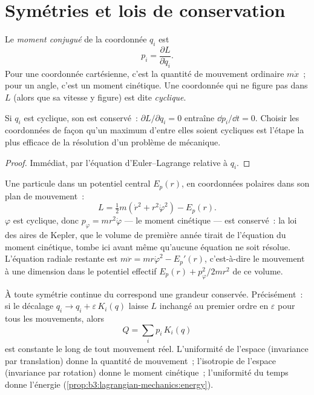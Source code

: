 \section{Symétries et lois de conservation}

\begin{definition}\label{def:b3:lagrangian-mechanics:momentum}
Le \emph{moment conjugué} de la coordonnée $q_i$ est
\[
p_i = \frac{\partial L}{\partial\dot q_i} .
\]
Pour une coordonnée cartésienne, c'est la quantité de mouvement
ordinaire $m\dot x$~; pour un angle, c'est un moment cinétique. Une
coordonnée qui ne figure pas dans $L$ (alors que sa vitesse y figure)
est dite \emph{cyclique}.
\end{definition}

\begin{proposition}\label{prop:b3:lagrangian-mechanics:cyclic}
Si $q_i$ est cyclique, son  est conservé~:
$\partial L/\partial q_i = 0$ entraîne $\dd p_i/\dd t = 0$. Choisir les
coordonnées de façon qu'un maximum d'entre elles soient cycliques est
l'étape la plus efficace de la résolution d'un problème de mécanique.
\end{proposition}

\begin{proof}
Immédiat, par l'équation d'Euler--Lagrange relative à $q_i$.
\end{proof}

\begin{example}\label{ex:b3:lagrangian-mechanics:central}
Une particule dans un potentiel central $E_p(r)$, en coordonnées
polaires dans son plan de mouvement~:
\[
L = \tfrac12 m(\dot r^2 + r^2\dot\varphi^2) - E_p(r) .
\]
$\varphi$ est cyclique, donc $p_\varphi = mr^2\dot\varphi$ --- le
moment cinétique --- est conservé~: la loi des aires de Kepler, que le
volume de première année tirait de l'équation du moment cinétique,
tombe ici avant même qu'aucune équation ne soit résolue. L'équation
radiale restante est $m\ddot r = mr\dot\varphi^2 - E_p'(r)$,
c'est-à-dire le mouvement à une dimension dans le potentiel effectif
$E_p(r) + p_\varphi^2/2mr^2$ de ce volume.
\end{example}

\begin{theorem}\label{thm:b3:lagrangian-mechanics:noether}
À toute symétrie continue du  correspond une grandeur
conservée. Précisément~: si le décalage $q_i \to q_i + \varepsilon\,K_i(q)$
laisse $L$ inchangé au premier ordre en $\varepsilon$ pour tous les
mouvements, alors
\[
Q = \sum_i p_i\,K_i(q)
\]
est constante le long de tout mouvement réel. L'uniformité de l'espace
(invariance par translation) donne la quantité de mouvement~;
l'isotropie de l'espace (invariance par rotation) donne le moment
cinétique~; l'uniformité du temps donne l'énergie
(\cref{prop:b3:lagrangian-mechanics:energy}).
\end{theorem}

